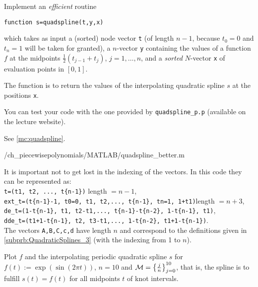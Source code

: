 \begin{problem}

\begin{subproblem}[3]  \label{subprb:QuadraticSplines_4}
Implement an \emph{efficient} \Matlab{} routine
\begin{center}
  \texttt{function s=quadspline(t,y,x)}
\end{center}
which takes as input
a (sorted) node vector \texttt{t} (of length $n-1$, because $t_{0}=0$ and $t_{n}=1$ will be taken for granted),
a $n$-vector \texttt{y} containing the values of a function $f$ at the midpoints $\frac{1}{2}(t_{j-1}+t_{j})$, $j=1,\ldots,n$,
and a \emph{sorted} $N$-vector \texttt{x} of evaluation points in $[0,1]$.

The function is to return the values of the interpolating quadratic spline $s$ at
the positions \texttt{x}.

You can test your code with the one provided by \texttt{quadspline\_p.p} (available on the lecture website).

\begin{solution}
See \autoref{mc:quadspline}.

{\problems/ch_piecewisepolynomials/MATLAB/quadspline_better.m}

It is important not to get lost in the indexing of the vectors. In this code they can be represented as:\\
{\tt t=(t1, t2, ..., t\{n-1\})} \quad length $=n-1$,\\
{\tt ext\_t=(t\{n-1\}-1, t0=0, t1, t2,..., t\{n-1\}, tn=1, 1+t1)}\quad length $=n+3$,\\
{\tt de\_t=(1-t\{n-1\}, t1, t2-t1,..., t\{n-1\}-t\{n-2\}, 1-t\{n-1\}, t1)}\;,\\
{\tt dde\_t=(t1+1-t\{n-1\}, t2, t3-t1,..., 1-t\{n-2\}, t1+1-t\{n-1\})}\;.\\
The vectors \texttt{A,B,C,c,d} have length $n$ and correspond to the definitions given in \ref{subprb:QuadraticSplines_3} (with the indexing from 1 to $n$).
\end{solution}
\end{subproblem}


\begin{subproblem}[1] \label{subprb:QuadraticSplines_5} Plot $f$ and the
  interpolating periodic quadratic spline $s$ for $f(t) := \exp(\sin(2\pi t))$,
  $n=10$ and ${\cal M} = \left\{\frac{j}{n}\right\}_{j=0}^{10}$, that is, the spline is
  to fulfill $s(t)=f(t)$ for all midpoints $t$ of knot intervals.


\end{subproblem}
\end{problem}
